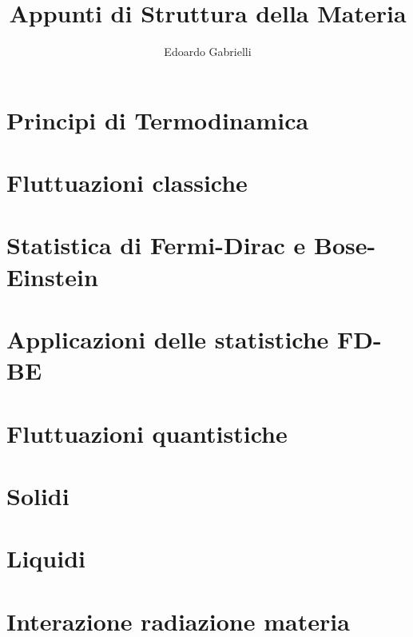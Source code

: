 

\author{Edoardo Gabrielli}
\title{Appunti di Struttura della Materia}


\maketitle
\clearpage
\tableofcontents
\clearpage
\chapter{Principi di Termodinamica}






\chapter{Fluttuazioni classiche}

\chapter{Statistica di Fermi-Dirac e Bose-Einstein}




\chapter{Applicazioni delle statistiche FD-BE}





\chapter{Fluttuazioni quantistiche}


\chapter{Solidi}




\chapter{Liquidi}






\chapter{Interazione radiazione materia}



 


